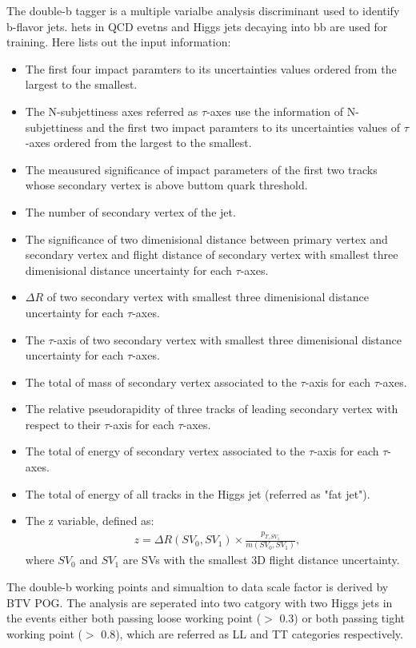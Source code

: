 The double-b tagger is a multiple varialbe analysis discriminant used to identify b-flavor jets. hets in QCD evetns and Higgs jets decaying into bb are used for training. Here lists out the input information:
\begin{itemize}
\item The first four impact paramters to its uncertainties values ordered from the largest to the smallest.
\item The  N-subjettiness axes referred as $\tau $-axes use the information of N-subjettiness and the first two impact paramters to its uncertainties values of $\tau $-axes ordered from the largest to the smallest.
\item The meausured significance of impact parameters of the first two tracks whose secondary vertex is above buttom quark threshold.
\item The number of secondary vertex of the jet.
\item The significance of two dimenisional distance between primary vertex and secondary vertex and flight distance of secondary vertex with smallest three dimenisional distance uncertainty for each $\tau $-axes.
\item $\Delta R$ of two secondary vertex with smallest three dimenisional distance uncertainty for each $\tau $-axes.
\item The $\tau $-axis of two secondary vertex with smallest three dimenisional distance uncertainty for each $\tau $-axes.
\item The total of mass of secondary vertex associated to the $\tau $-axis for each $\tau $-axes.
\item The relative pseudorapidity of three tracks of leading secondary vertex with respect to their $\tau $-axis for each $\tau $-axes.
\item The total of energy of secondary vertex associated to the $\tau $-axis for each $\tau $-axes.
\item The total of energy of all tracks in the Higgs jet (referred as "fat jet").
\item The z variable, defined as: 
\begin{equation} \label{eq7}
\begin{split}
z = \Delta R (SV_0, SV_1) \times \frac{p_{T,SV_1}}{m(SV_0,SV_1)}, 
\end{split}
\end{equation}
where $SV_0$ and $SV_1$ are SVs with the smallest 3D flight distance uncertainty.
\end{itemize} 
The double-b working points and simualtion to data scale factor is derived by BTV POG.
The analysis are seperated into two catgory with two Higgs jets in the events either both passing loose working point ($>$ 0.3) or both passing tight working point ($>$ 0.8), which are referred as LL and TT categories respectively.



